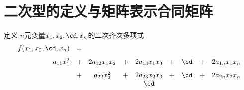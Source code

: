 \section{二次型的定义与矩阵表示\quad 合同矩阵}

\begin{frame}
  \begin{footnotesize}
    \begin{block}{定义}
      $n$元变量$x_1,x_2,\cd,x_n$的二次齐次多项式
      $$
      \begin{array}{rcccccccccc}
        f(x_1,x_2,\cd,x_n) &=& \\[0.1in]
        a_{11}x_1^2&+&2a_{12}x_1x_2&+&2a_{13}x_1x_3&+&\cd&+&2a_{1n}x_1x_n\\[0.1in]
        &+&a_{22}x_2^2&+&2a_{23}x_2x_3&+&\cd&+&2a_{2n}x_2x_n\\
        &&&&\cd\\
      \end{array}
      $$
    \end{block}
  \end{footnotesize}
\end{frame}
